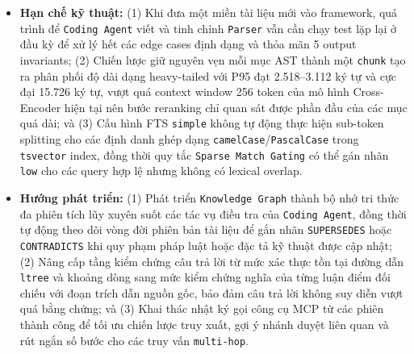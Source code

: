 \begin{itemize}
\begin{enumerate}
        \item \textbf{Chủ động điều tra lặp qua bộ 6 MCP tools và kiểm chứng trích dẫn tất định:} Thay thế lối \texttt{one-shot context stuffing} và việc dựng đồ thị suy đoán lúc nạp bằng bộ 6 MCP tools trên nền \texttt{Warm Streamable HTTP} (chia sẻ trực tiếp bộ máy suy luận GPU), cho phép \texttt{Coding Agent} tự tìm kiếm nhiều bước, duyệt cây \texttt{ltree} có tái tạo nút cha ảo, đọc lát cắt dòng thô, bồi đắp \texttt{Knowledge Graph} tại thời điểm suy luận và xác thực tọa độ trích dẫn trực tiếp trên PostgreSQL. Kiến trúc \texttt{Warm Streamable HTTP} giảm độ trễ lệnh gọi công cụ đầu tiên từ $29.727\text{ ms}$ xuống $695\text{--}768\text{ ms}$ ($\approx 40\times$), chặn đứng mọi cạnh quan hệ và trích dẫn đường dẫn không tồn tại trong cơ sở dữ liệu, đồng thời giúp \texttt{Coding Agent} giải quyết trọn vẹn các tình huống hỏi đáp pháp lý \texttt{multi-hop} có kiểm chứng trích dẫn xuyên suốt Luật 08/2022/QH15, Nghị định 46/2023/NĐ-CP và Thông tư 67/2023/TT-BTC.
    \end{enumerate}
    \item \textbf{Hạn chế kỹ thuật:} (1) Khi đưa một miền tài liệu mới vào framework, quá trình để \texttt{Coding Agent} viết và tinh chỉnh \texttt{Parser} vẫn cần chạy test lặp lại ở đầu kỳ để xử lý hết các edge cases định dạng và thỏa mãn 5 output invariants; (2) Chiến lược giữ nguyên vẹn mỗi mục AST thành một \texttt{chunk} tạo ra phân phối độ dài dạng heavy-tailed với P95 đạt 2.518--3.112 ký tự và cực đại 15.726 ký tự, vượt quá context window 256 token của mô hình Cross-Encoder hiện tại nên bước reranking chỉ quan sát được phần đầu của các mục quá dài; và (3) Cấu hình FTS \texttt{simple} không tự động thực hiện sub-token splitting cho các định danh ghép dạng \texttt{camelCase}/\texttt{PascalCase} trong \texttt{tsvector} index, đồng thời quy tắc \texttt{Sparse Match Gating} có thể gán nhãn \texttt{low} cho các query hợp lệ nhưng không có lexical overlap.
    \item \textbf{Hướng phát triển:} (1) Phát triển \texttt{Knowledge Graph} thành bộ nhớ tri thức đa phiên tích lũy xuyên suốt các tác vụ điều tra của \texttt{Coding Agent}, đồng thời tự động theo dõi vòng đời phiên bản tài liệu để gắn nhãn \texttt{SUPERSEDES} hoặc \texttt{CONTRADICTS} khi quy phạm pháp luật hoặc đặc tả kỹ thuật được cập nhật; (2) Nâng cấp tầng kiểm chứng câu trả lời từ mức xác thực tồn tại đường dẫn \texttt{ltree} và khoảng dòng sang mức kiểm chứng nghĩa của từng luận điểm đối chiếu với đoạn trích dẫn nguồn gốc, bảo đảm câu trả lời không suy diễn vượt quá bằng chứng; và (3) Khai thác nhật ký gọi công cụ MCP từ các phiên thành công để tối ưu chiến lược truy xuất, gợi ý nhánh duyệt liên quan và rút ngắn số bước cho các truy vấn \texttt{multi-hop}.
\end{itemize}
